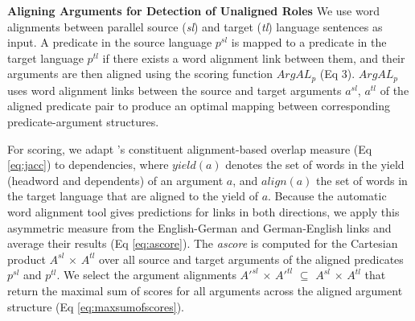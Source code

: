 \documentclass[11pt]{article}
\begin{document}
{\bf  \flushleft Aligning Arguments for Detection of Unaligned Roles}
We use word alignments between parallel source (\textit{sl}) and target (\textit{tl}) language sentences as input. A predicate in the source language $p^{sl}$ is mapped to a predicate in the target language $ p^{tl}$  if there exists a word alignment link between them, and their arguments are then aligned using the scoring function $ArgAL_p$ (Eq 3). $ArgAL_p$ uses word alignment links between the source and target arguments $a^{sl}$, $a^{tl}$ of the aligned predicate pair to produce an optimal mapping between corresponding predicate-argument structures. 

For scoring, we adapt  's constituent alignment-based overlap measure (Eq \ref{eq:jacc}) to dependencies, where $yield(a)$ denotes the set of words in the yield (headword and dependents) of an argument $a$, and $align(a)$ the set of words in the target language that are aligned to the yield of $a$. Because the automatic word alignment tool gives predictions for links in both directions, we apply this asymmetric measure from the English-German and German-English links and average their results (Eq \ref{eq:ascore}). %
The {\em ascore} is computed for the Cartesian product $A^{sl}$ $\times$ $A^{tl}$ over all source and target arguments of the aligned predicates $p^{sl}$ and $p^{tl}$.
We select the argument alignments ${A'}^{sl}$ $\times$ ${A'}^{tl}$ $\subseteq$ $A^{sl}$ $\times$ $A^{tl}$  that return the maximal sum of scores for all arguments across the aligned argument structure (Eq \ref{eq:maxsumofscores}).
\end{document}
